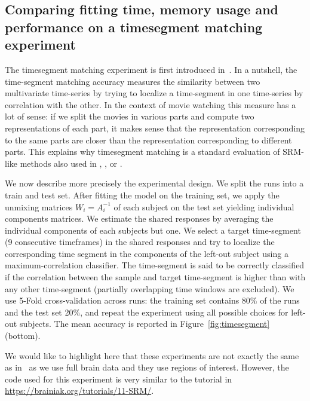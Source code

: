 \subsection{Comparing fitting time, memory usage and performance on a
  timesegment matching experiment}
\label{sec:timesegment_expe}
\label{timesegment_expe}
The timesegment matching experiment is first introduced
in~\cite{chen2015reduced}.
In a nutshell, the time-segment matching accuracy measures the similarity between two multivariate time-series by trying to localize a time-segment in one time-series by correlation with the other.
In the context of movie watching this measure has a lot of sense: if we split
the movies in various parts and compute two representations of each part, it makes
sense that the representation corresponding to the same parts are closer than
the representation corresponding to different parts. 
This explains why timesegment matching is a standard evaluation of SRM-like methods also used in  \cite{chen2015reduced}, \cite{guntupalli2018computational}, \cite{Nastase741975} or
\cite{zhang2016searchlight}.

We now describe more precisely the experimental design.
We split the runs into a train and test set. After fitting the model on the
training set, we apply the unmixing matrices $W_i=A_i^{-1}$ of each subject on the test set yielding individual components matrices. We estimate the shared responses by averaging the individual components of each subjects but one.  We select a target time-segment (9 consecutive timeframes) in the shared responses and try to localize the corresponding time segment in the components of the left-out subject using a maximum-correlation classifier.
The time-segment is said to be
correctly classified if the correlation between the sample and target
time-segment is higher than with any other time-segment (partially overlapping time windows are excluded).
% 
We use 5-Fold cross-validation across runs: the training set contains 80\% of the runs and the test set 20\%, and repeat the experiment using all possible choices for left-out subjects. 
% 
The mean accuracy is reported in Figure~\ref{fig:timesegment} (bottom). 
% 

We would like to highlight here that these experiments are not exactly the same
as in~\cite{chen2015reduced} as we use full brain data and they use regions of
interest. However, the code used for this experiment is very similar to the tutorial in \url{https://brainiak.org/tutorials/11-SRM/}.

